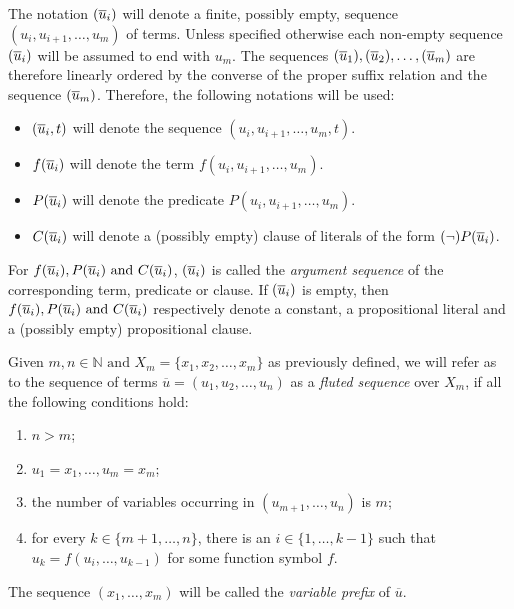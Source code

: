 The notation \(\flseq{i}\) will denote a finite, possibly empty, sequence \((u_i,u_{i+1}, \ldots, u_m)\) of terms. Unless specified otherwise each non-empty sequence \(\flseq{i}\) will be assumed to end with \(u_m\).
The sequences \(\flseq{1},\flseq{2},\ldots,\flseq{m}\) are therefore linearly ordered by the converse of the proper suffix relation and the sequence \(\flseq{m}\).
Therefore, the following notations will be used:
\begin{itemize}
  \item \(\flseq{i}[t]\) will denote the sequence \((u_i,u_{i+1}, \ldots, u_m,t)\).
  \item \(f\flseq{i}\) will denote the term \(f(u_i,u_{i+1}, \ldots, u_m)\).
  \item \(P\flseq{i}\) will denote the predicate \(P(u_i,u_{i+1}, \ldots, u_m)\).
  \item \(C\flseq{i}\) will denote a (possibly empty) clause of literals of the form \((\neg)P\flseq{i}\).
\end{itemize}

For \(f\flseq{i},P\flseq{i} \text{ and } C\flseq{i} \), \(\flseq{i}\) is called the \emph{argument sequence} of the corresponding term, predicate or clause.
If \(\flseq{i}\) is empty, then \(f\flseq{i}, P\flseq{i} \text{ and } C\flseq{i}\) respectively denote a constant, a propositional literal and a (possibly empty) propositional clause.

\begin{definition}\label{def:fluted-sequence}
Given \(m,n \in \mathbb{N} \text{ and } X_m = \{x_1,x_2,\ldots,x_m\}\) as previously defined, we will refer as to the sequence of terms \(\overline{u} = (u_1,u_2,\ldots,u_n)\) as a \emph{fluted sequence} over \(X_m\), if all the following conditions hold:
\begin{enumerate}[label= (\roman*)]
  \item \(n > m\);
  \item \(u_1=x_1,\ldots,u_m=x_m\);
  \item the number of variables occurring in \((u_{m+1},\ldots,u_n)\) is \(m\);
  \item for every \(k \in \{m+1,\ldots,n\}\), there is an \(i \in \{1,\ldots,k-1\}\) such that \\\(u_k = f(u_i,\ldots,u_{k-1})\) for some function symbol \(f\).
\end{enumerate}
The sequence \((x_1, \ldots, x_m)\) will be called the \emph{variable prefix} of \(\overline{u}\).
\end{definition}

